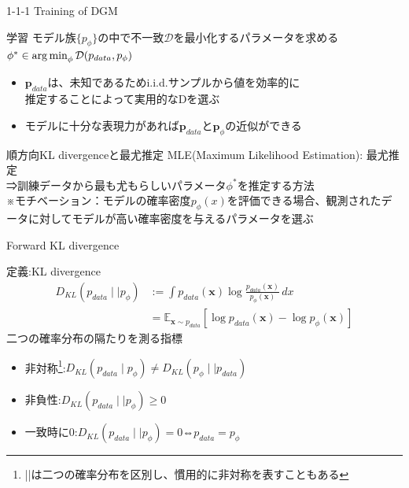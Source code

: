 \begin{frame}{1-1-1 Training of DGM}
\begin{block}{学習}
モデル族$\{p_{\phi}\}$の中で不一致$\mathcal{D}$を最小化するパラメータを求める\\
\centering $\phi^{*}\in \operatorname*{arg\,min}_{\phi}\mathcal{D}(p_{data},p_{\phi})$
\end{block}
\begin{itemize}
\item $\boldsymbol{p}_{data}$は、未知であるためi.i.d.サンプルから値を効率的に\\
推定することによって実用的なDを選ぶ\\
\item モデルに十分な表現力があれば$\boldsymbol{p}_{data}$と$\boldsymbol{p}_{\phi}$の近似ができる\\
\end{itemize}

\begin{block}{順方向KL divergenceと最尤推定}
    MLE(Maximum Likelihood Estimation): 最尤推定\\
    ⇒訓練データから最も尤もらしいパラメータ$\phi^{*}$を推定する方法\\
    \small ※モチベーション：モデルの確率密度$p_{\phi}(x)$を評価できる場合、観測されたデータに対してモデルが高い確率密度を与えるパラメータを選ぶ\\
\end{block}

\end{frame}
\begin{frame}{Forward KL divergence}
\begin{block}{定義:KL divergence}
    \begin{align*}
        D_{KL}(p_{data}\mid\mid p_{\phi})
        &:= \int p_{data}(\boldsymbol{x})\log\frac{p_{data}(\boldsymbol{x})}{p_{\phi}(\boldsymbol{x})}\,dx \\
        &= \mathbb{E}_{\boldsymbol{x}\sim p_{data}}
            [\log p_{data}(\boldsymbol{x})-\log p_{\phi}(\boldsymbol{x})]
        \end{align*}
        二つの確率分布の隔たりを測る指標
\end{block}

\begin{itemize}
    \item 非対称\footnote{||は二つの確率分布を区別し、慣用的に非対称を表すこともある}:$D_{KL}(p_{data}\mid p_{\phi} )\neq D_{KL}(p_{\phi}\mid\mid p_{data})$
    \item 非負性:$D_{KL}(p_{data}\mid\mid p_{\phi})\geq 0$
    \item 一致時に0:$D_{KL}(p_{data}\mid\mid p_{\phi})=0$⇔$p_{data}=p_{\phi}$
\end{itemize}

\end{frame}
